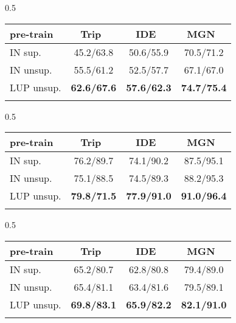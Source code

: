 \documentclass[final]{cvpr}
\begin{document}
\begin{table*}[htb]
\setlength{\tabcolsep}{3.3mm}
    \begin{subtable}[h]{0.5\textwidth}
        \centering
        \begin{tabular}{l|ccc}
        \shline
        pre-train & Trip~\cite{hermans2017defense} & IDE~\cite{zheng2017person} & MGN~\cite{wang2018learning} \\
        \hline
        IN sup.    & 45.2/63.8 & 50.6/55.9 & 70.5/71.2 \\ \hline
        IN unsup.  & 55.5/61.2 & 52.5/57.7 & 67.1/67.0 \\ \hline
        LUP unsup. & \textbf{62.6/67.6} & \textbf{57.6/62.3} & \textbf{74.7/75.4} \\ \shline
        \end{tabular}
        \vspace{-0.12cm}
        \caption{CUHK03}
        \label{tab:improve-cuhk}
    \end{subtable}
    \hfill
    \begin{subtable}[h]{0.5\textwidth}
    \centering
        \begin{tabular}{l|ccc}
        \shline
        pre-train & Trip~\cite{hermans2017defense} & IDE~\cite{zheng2017person} & MGN~\cite{wang2018learning} \\
        \hline
        IN sup.    & 76.2/89.7 & 74.1/90.2 & 87.5/95.1 \\ \hline
        IN unsup.  & 75.1/88.5 & 74.5/89.3 & 88.2/95.3 \\ \hline
        LUP unsup. & \textbf{79.8/71.5} & \textbf{77.9/91.0} & \textbf{91.0/96.4} \\ \shline
        \end{tabular}
        \vspace{-0.12cm}
        \caption{Market1501}
        \label{tab:improve-market}
    \end{subtable}
    \hfill
    \begin{subtable}[h]{0.5\textwidth}
    \centering
        \begin{tabular}{l|ccc}
        \shline
        pre-train & Trip~\cite{hermans2017defense} & IDE~\cite{zheng2017person} & MGN~\cite{wang2018learning} \\
        \hline
        IN sup.    & 65.2/80.7 & 62.8/80.8 & 79.4/89.0 \\ \hline
        IN unsup.  & 65.4/81.1 & 63.4/81.6 & 79.5/89.1 \\ \hline
        LUP unsup. & \textbf{69.8/83.1} & \textbf{65.9/82.2} & \textbf{82.1/91.0} \\ \shline

\end{tabular}
\end{subtable}
\end{table*}
\end{document}
